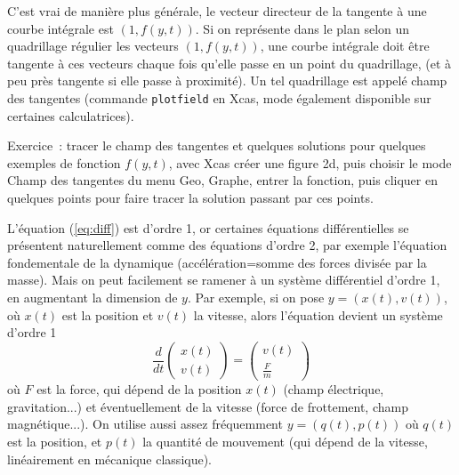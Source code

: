 \documentclass[a4paper,11pt]{article}
\begin{document}
C'est vrai de mani\`ere plus g\'en\'erale, le vecteur directeur
de la tangente \`a une courbe int\'egrale est $(1,f(y,t))$. Si
on repr\'esente dans le plan selon un quadrillage r\'egulier
les vecteurs $(1,f(y,t))$, une courbe int\'egrale doit \^etre
tangente \`a ces vecteurs chaque fois qu'elle passe en un point
du quadrillage, (et \`a peu pr\`es tangente si elle passe \`a
proximit\'e). Un tel quadrillage est appel\'e champ des tangentes
(commande \verb|plotfield| en Xcas, mode \'egalement disponible
sur certaines calculatrices).

Exercice~: tracer le champ des tangentes et quelques solutions
pour quelques exemples de fonction $f(y,t)$, avec Xcas cr\'eer
une figure 2d, puis choisir le mode Champ des tangentes
du menu Geo, Graphe, entrer la fonction, puis cliquer en quelques
points pour faire tracer la solution passant par ces points.

L'\'equation (\ref{eq:diff}) est d'ordre 1, or certaines \'equations
diff\'erentielles se pr\'esentent naturellement comme des
\'equations d'ordre 2, par exemple l'\'equation fondementale
de la dynamique (acc\'el\'eration=somme des forces divis\'ee par
la masse). Mais on peut facilement se ramener \`a un
syst\`eme diff\'erentiel d'ordre
1, en augmentant la dimension de $y$. Par exemple, si
on pose $y=(x(t),v(t))$, o\`u $x(t)$ est la position
et $v(t)$ la vitesse, alors l'\'equation devient un syst\`eme d'ordre 1
$$ \frac{d}{dt} \left(\begin{array}{c} x(t) \\ v(t) \end{array}
\right) 
= \left(\begin{array}{c} v(t) \\ \frac{F}{m} \end{array} \right) $$
o\`u $F$ est la force, qui d\'epend de la position $x(t)$ 
(champ \'electrique, gravitation...) et
\'eventuellement de la vitesse (force de frottement, champ magn\'etique...).
On utilise aussi assez fr\'equemment $y=(q(t),p(t))$
o\`u $q(t)$ est la position, et $p(t)$ la quantit\'e de mouvement
(qui d\'epend de la vitesse, lin\'eairement en m\'ecanique classique).
\end{document}
